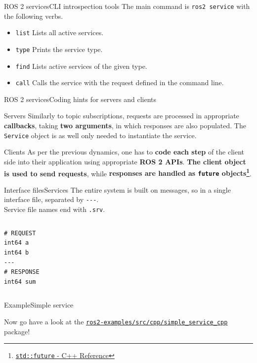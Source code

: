 \begin{frame}{ROS 2 services}{CLI introspection tools}
  The main command is \texttt{ros2 service} with the following verbs.
  \begin{itemize}
    \item \texttt{list} Lists all active services.
    \item \texttt{type} Prints the service type.
    \item \texttt{find} Lists active services of the given type.
    \item \texttt{call} Calls the service with the request defined in the command line.
  \end{itemize}
\end{frame}
\begin{frame}{ROS 2 services}{Coding hints for servers and clients}
  \begin{block}{Servers}
    Similarly to topic subscriptions, requests are processed in appropriate \textbf{callbacks}, taking \textbf{two arguments}, in which responses are also populated. The \texttt{Service} object is as well only needed to instantiate the service.
  \end{block}
  \begin{block}{Clients}
    As per the previous dynamics, one has to \textbf{code each step} of the client side into their application using appropriate \textbf{ROS 2 APIs}. \textbf{The client object is used to send requests}, while \textbf{responses are handled as \texttt{future} objects\footnote{\href{https://en.cppreference.com/w/cpp/thread/future}{\color{blue}\underline{\texttt{std::future} - C++ Reference}}}}.
  \end{block}
\end{frame}

\begin{frame}[fragile]{Interface files}{Services}
  The entire system is built on messages, so  in a single interface file, separated by \texttt{-{}-{}-}.\\
  Service file names end with \texttt{.srv}.
  \begin{columns}
  \begin{lstlisting}[language=ros2msg, caption=Definition of the \texttt{example\_interfaces/srv/AddTwoInts} service.]
# REQUEST
int64 a
int64 b
---
# RESPONSE
int64 sum\end{lstlisting}
  \end{columns}
\end{frame}

\begin{frame}{Example}{Simple service}
  \begin{block}{}
    \centering
    Now go have a look at the \href{https://github.com/IntelligentSystemsLabUTV/ros2-examples/tree/humble/src/cpp/simple_service_cpp}{\color{blue}\underline{\texttt{ros2-examples/src/cpp/simple\_service\_cpp}}} package!
  \end{block}
\end{frame}
